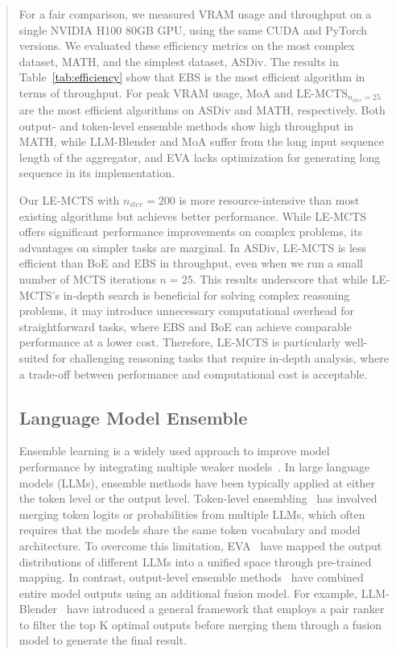 \documentclass[11pt]{article}
\begin{document}
\begin{abstract}
For a fair comparison, we measured VRAM usage and throughput on a single NVIDIA H100 80GB GPU, using the same CUDA and PyTorch versions. 
We evaluated these efficiency metrics on the most complex dataset, MATH, and the simplest dataset, ASDiv.
The results in Table~\ref{tab:efficiency} show that EBS is the most efficient algorithm in terms of throughput.
For peak VRAM usage, MoA and \(\text{LE-MCTS}_{n_{iter}=25}\) are the most efficient algorithms on ASDiv and MATH, respectively.
Both output- and token-level ensemble methods show high throughput in MATH, while LLM-Blender and MoA suffer from the long input sequence length of the aggregator, and EVA lacks optimization for generating long sequence in its implementation.

Our LE-MCTS with \(n_{iter}=200\) is more resource-intensive than most existing algorithms but achieves better performance.
While LE-MCTS offers significant performance improvements on complex problems, its advantages on simpler tasks are marginal. 
In ASDiv, LE-MCTS is less efficient than BoE and EBS in throughput, even when we run a small number of MCTS iterations \(n=25\).
This results underscore that while LE-MCTS's in-depth search is beneficial for solving complex reasoning problems, it may introduce unnecessary computational overhead for straightforward tasks, where EBS and BoE can achieve comparable performance at a lower cost. 
Therefore, LE-MCTS is particularly well-suited for challenging reasoning tasks that require in-depth analysis, where a trade-off between performance and computational cost is acceptable.

\subsection{Language Model Ensemble}
\label{text:relwork:llm_ensemble}
Ensemble learning is a widely used approach to improve model performance by integrating multiple weaker models~\citep{lu-etal-2024-lesurvey}. 
In large language models (LLMs), ensemble methods have been typically applied at either the token level or the output level. 
Token-level ensembling~\citep{liu-etal-2021-dexperts,liu-etal-2024-tuning,li-etal-2024-purifying,mavromatis-etal-2024-packllm} has involved merging token logits or probabilities from multiple LLMs, which often requires that the models share the same token vocabulary and model architecture. 
To overcome this limitation, EVA~\citep{xu-etal-2024-bridging} have mapped the output distributions of different LLMs into a unified space through pre-trained mapping. 
In contrast, output-level ensemble methods~\citep{jiang-etal-2023-llm,wang-etal-2024-mixture,izacard-grave-2021-leveraging,ravaut-etal-2022-towards} have combined entire model outputs using an additional fusion model. 
For example, LLM-Blender~\citep{jiang-etal-2023-llm} have introduced a general framework that employs a pair ranker to filter the top K optimal outputs before merging them through a fusion model to generate the final result. 


\end{abstract}
\end{document}
